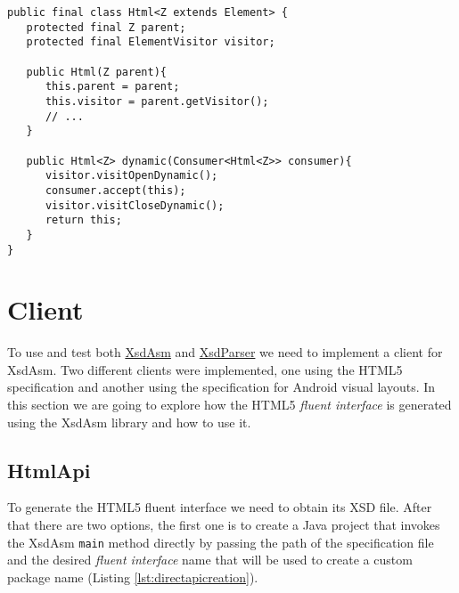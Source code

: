 \bigskip


\begin{minipage}{\linewidth}
\begin{lstlisting}[caption={Html class Dynamic method},label={lst:htmldynamicmethod}]
public final class Html<Z extends Element> {
   protected final Z parent;
   protected final ElementVisitor visitor;
   
   public Html(Z parent){
      this.parent = parent;
      this.visitor = parent.getVisitor();
      // ...
   }
   
   public Html<Z> dynamic(Consumer<Html<Z>> consumer){
      visitor.visitOpenDynamic();
      consumer.accept(this);
      visitor.visitCloseDynamic();
      return this;
   }   
}
\end{lstlisting}
\end{minipage}

\newpage

\section{Client} %
\label{sec:client}

To use and test both \hyperref[sec:xsdasm]{XsdAsm} and \hyperref[sec:xsdparser]{XsdParser} we need to implement a client for XsdAsm. Two different clients were implemented, one using the \ac{HTML}5 specification and another using the specification for Android visual layouts. In this section we are going to explore how the \ac{HTML}5 \textit{fluent interface} is generated using the XsdAsm library and how to use it.

\subsection{HtmlApi}

To generate the \ac{HTML}5 fluent interface we need to obtain its \ac{XSD} file. After that there are two options, the first one is to create a Java project that invokes the XsdAsm \texttt{main} method directly by passing the path of the specification file and the desired \textit{fluent interface} name that will be used to create a custom package name (Listing \ref{lst:directapicreation}).

\bigskip


